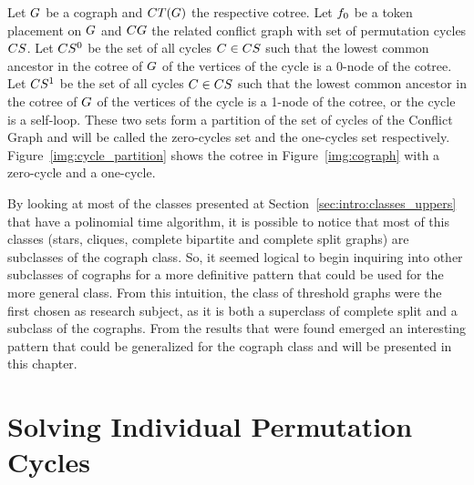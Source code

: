 \documentclass[msc,english,table,xcdraw]{ppgccufmg}
\begin{document}
Let $G$ be a cograph and $CT(G)$ the respective cotree. 
Let $f_{0}$ be a token placement on $G$ and $CG$ the related 
conflict graph with set of permutation cycles $CS$.
Let $CS^{0}$ be the set of all cycles $C \in CS$ such that
the lowest common ancestor in the cotree of $G$ of the vertices of the cycle
is a 0-node of the cotree. Let $CS^{1}$ be the set of all cycles $C \in 
CS$ such that the lowest common ancestor in the cotree of $G$ of the 
vertices of the cycle is a 1-node of the cotree, or the cycle is a self-loop.
These two sets form a partition of the set of cycles of the Conflict Graph and will 
be called the zero-cycles set and the one-cycles set respectively. 
Figure~\ref{img:cycle_partition} shows the cotree in Figure~\ref{img:cograph} with 
a zero-cycle and a one-cycle.

By looking at most of the classes presented at Section~\ref{sec:intro:classes_uppers} 
that have a polinomial time algorithm, it is possible to notice that most of this classes 
(stars, cliques, complete bipartite and complete split graphs) are subclasses 
of the cograph class.
So, it seemed logical to begin inquiring into other subclasses of cographs for a more
definitive pattern that could be used for the more general class.
From this intuition, the class of threshold graphs were the first chosen as research
subject, as it is both a superclass of complete split and a subclass of the cographs.
From the results that were found emerged an interesting pattern that could be generalized
for the cograph class and will be presented in this chapter.


\section{Solving Individual Permutation Cycles}
\label{sec:solvindpermcycles}

\end{document}
